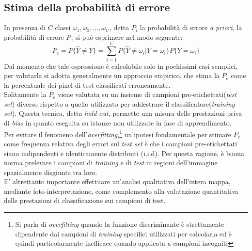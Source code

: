 \subsection{Stima della probabilità di errore}
In presenza di $C$ classi $\omega_1,\omega_2, \ldots, \omega_C$, detta $P_i$ la probabilità di errore \emph{a priori}, la probabilità di errore $P_e$ si può esprimere nel modo seguente:
\begin{equation}
\label{eq:P_e}
P_e = P\lbrace\widehat{Y}\neq Y\rbrace= {\sum_{i=1}^C P\lbrace\widehat{Y}\neq \omega_i\vert Y = \omega_i\rbrace}P\lbrace Y =\omega_i\rbrace
\end{equation}
Dal momento che tale espressione è calcolabile solo in pochissimi casi semplici, per valutarla si adotta generalmente un approccio empirico, che stima la $P_e$ come la percentuale dei pixel di test classificati erroneamente.\\
Solitamente la $P_e$ viene valutata su un insieme di campioni pre-etichettati(\emph{test set}) diverso rispetto a quello utilizzato per addestrare il classificatore(\emph{training set}). Questa tecnica, detta \emph{hold-out}, permette una misura delle prestazioni priva di \emph{bias} in quanto eseguita su istanze non utilizzate in fase di apprendimento.\\
Per evitare il fenomeno dell'\emph{overfitting},\footnote{Si parla di \emph{overfitting} quando la funzione discriminante è strettamente dipendente dai campioni di \emph{training} specifici utilizzati per calcolarla ed è quindi particolarmente inefficace quando applicata a campioni incogniti} un'ipotesi fondamentale per stimare $P_e$ come frequenza relativa degli errori sul \emph{test set} è che i campioni pre-etichettati siano indipendenti e identicamente distribuiti (i.i.d). Per questa ragione, è buona norma prelevare i campioni di \emph{training} e di \emph{test} in regioni dell'immagine spazialmente disgiunte tra loro.\\
E' altrettanto importante effettuare un'analisi qualitativa dell'intera mappa, mediante foto-interpretazione, come complemento alla valutazione quantitativa delle prestazioni di classificazione sui campioni di test.

